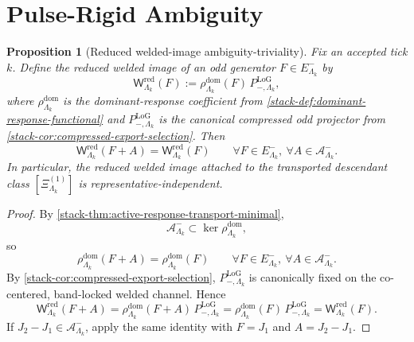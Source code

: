 \documentclass[11pt]{article}
\newtheorem{proposition}[theorem]{Proposition}
\theoremstyle{definition}
\begin{document}
\section{Pulse-Rigid Ambiguity}

\begin{proposition}[Reduced welded-image ambiguity-triviality]
\label{prop:reduced-welded-ambiguity-trivial}
Fix an accepted tick \(k\).
Define the reduced welded image of an odd generator \(F\in E^-_{\Lambda_k}\) by
\[
\mathsf W^{\mathrm{red}}_{\Lambda_k}(F)
:=
\rho^{\mathrm{dom}}_{\Lambda_k}(F)\,P_{-,\Lambda_k}^{\mathrm{LoG}},
\]
where \(\rho^{\mathrm{dom}}_{\Lambda_k}\) is the dominant-response coefficient from
\cref{stack-def:dominant-response-functional} and
\(P_{-,\Lambda_k}^{\mathrm{LoG}}\) is the canonical compressed odd projector from
\cref{stack-cor:compressed-export-selection}.
Then
\[
\mathsf W^{\mathrm{red}}_{\Lambda_k}(F+A)
=
\mathsf W^{\mathrm{red}}_{\Lambda_k}(F)
\qquad
\forall F\in E^-_{\Lambda_k},\ \forall A\in\mathcal A^-_{\Lambda_k}.
\]
In particular, the reduced welded image attached to the transported descendant class
\([\Xi^{(1)}_{\Lambda_k}]\) is representative-independent.
\end{proposition}

\begin{proof}
By \cref{stack-thm:active-response-transport-minimal},
\[
\mathcal A^-_{\Lambda_k}\subset\ker\rho^{\mathrm{dom}}_{\Lambda_k},
\]
so
\[
\rho^{\mathrm{dom}}_{\Lambda_k}(F+A)
=
\rho^{\mathrm{dom}}_{\Lambda_k}(F)
\qquad
\forall F\in E^-_{\Lambda_k},\ \forall A\in\mathcal A^-_{\Lambda_k}.
\]
By \cref{stack-cor:compressed-export-selection},
\(
P_{-,\Lambda_k}^{\mathrm{LoG}}
\)
is canonically fixed on the co-centered, band-locked welded channel.
Hence
\[
\mathsf W^{\mathrm{red}}_{\Lambda_k}(F+A)
=
\rho^{\mathrm{dom}}_{\Lambda_k}(F+A)\,P_{-,\Lambda_k}^{\mathrm{LoG}}
=
\rho^{\mathrm{dom}}_{\Lambda_k}(F)\,P_{-,\Lambda_k}^{\mathrm{LoG}}
=
\mathsf W^{\mathrm{red}}_{\Lambda_k}(F).
\]
If \(J_2-J_1\in\mathcal A^-_{\Lambda_k}\), apply the same identity with \(F=J_1\) and
\(A=J_2-J_1\).
\end{proof}
\end{document}

